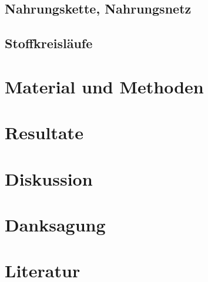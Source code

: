 \documentclass{article}
\begin{document}
\subsection{Nahrungskette, Nahrungsnetz}

\subsection{Stoffkreisläufe}


\section{Material und Methoden}

\section{Resultate}

\section{Diskussion}

\section{Danksagung}

\section{Literatur}
\end{document}
